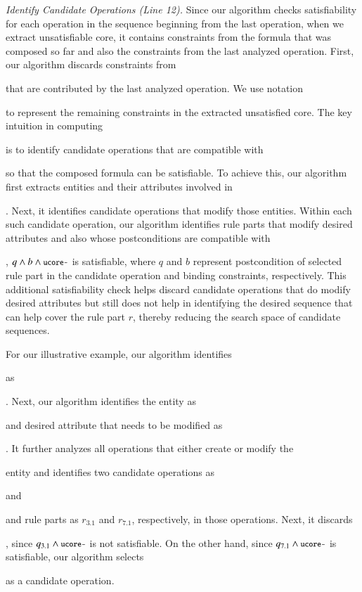 \textit{Identify Candidate Operations (Line 12).} Since our algorithm checks satisfiability for
each operation in the sequence beginning from the last operation, when we 
extract unsatisfiable core, it contains constraints from the formula that was
composed so far and also the constraints from the last analyzed operation. First, our algorithm
discards constraints from \subject{ucore} that are contributed by the last analyzed operation.
We use notation \subject{ucore-} to represent the remaining constraints in the extracted
unsatisfied core. The key intuition in computing \subject{ucore-} is to identify candidate operations
that are compatible with \subject{ucore-} so that the composed formula can be satisfiable.
To achieve this, our algorithm first extracts entities and their attributes involved
in \subject{ucore-}. Next, it identifies candidate operations that modify those entities.
Within each such candidate operation, our algorithm identifies rule parts 
that modify desired attributes and also whose
postconditions are compatible with \subject{ucore-}, \ie{} $q \wedge b \wedge \subject{ucore-}$
is satisfiable, where $q$ and $b$ represent postcondition of selected rule part
in the candidate operation and binding constraints, respectively. 
This additional satisfiability check helps discard candidate operations that
do modify desired attributes but still does not help in identifying the desired
sequence that can help cover the rule part $r$, thereby reducing the search
space of candidate sequences.

For our illustrative example, our algorithm identifies \subject{ucore-} as \subject{ord.total > 0}.
Next, our algorithm identifies the entity as \subject{Order} and desired attribute
that needs to be modified as \subject{total}. It further analyzes all operations
that either create or modify the \subject{Order} entity and identifies two candidate operations 
as \subject{CreateOrder} and \subject{AddItemToOrder}
and rule parts as $r_{3.1}$ and $r_{7.1}$, respectively, in those operations.
Next, it discards \subject{CreateOrder}, since $q_{3.1} \wedge \subject{ucore-}$
is not satisfiable. On the other hand, since $q_{7.1} \wedge \subject{ucore-}$
is satisfiable, our algorithm selects \subject{AddItemToOrder} as a candidate 
operation.


